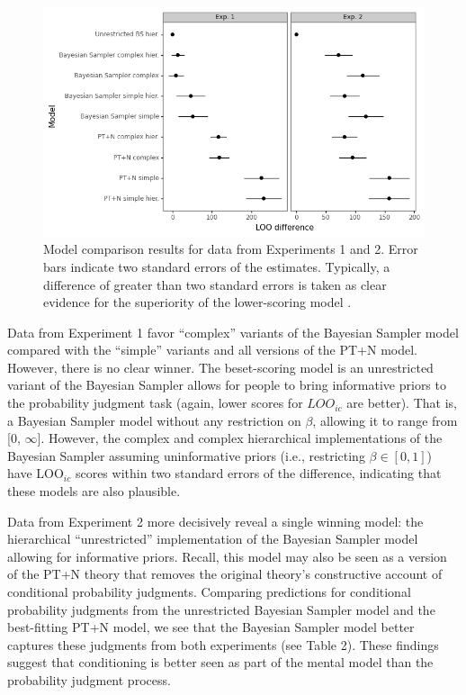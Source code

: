 \documentclass[
  english,
  man,floatsintext]{apa6}
\begin{document}
\begin{figure}[ht]
\centering
\includegraphics[width=6in]{plot_compare.png}
\caption{Model comparison results for data from Experiments 1 and 2. Error bars indicate two standard errors of the estimates. Typically, a difference of greater than two standard errors is taken as clear evidence for the superiority of the lower-scoring model \cite{sivula.etal2020}.}
\end{figure}

Data from Experiment 1 favor ``complex'' variants of the Bayesian Sampler model compared with the ``simple'' variants and all versions of the PT+N model. However, there is no clear winner. The beset-scoring model is an unrestricted variant of the Bayesian Sampler allows for people to bring informative priors to the probability judgment task (again, lower scores for \(LOO_{ic}\) are better). That is, a Bayesian Sampler model without any restriction on \(\beta\), allowing it to range from {[}0, \(\infty\){]}. However, the complex and complex hierarchical implementations of the Bayesian Sampler assuming uninformative priors (i.e., restricting \(\beta \in [0,1]\)) have \(\text{LOO}_{ic}\) scores within two standard errors of the difference, indicating that these models are also plausible.

Data from Experiment 2 more decisively reveal a single winning model: the hierarchical ``unrestricted'' implementation of the Bayesian Sampler model allowing for informative priors. Recall, this model may also be seen as a version of the PT+N theory that removes the original theory's constructive account of conditional probability judgments. Comparing predictions for conditional probability judgments from the unrestricted Bayesian Sampler model and the best-fitting PT+N model, we see that the Bayesian Sampler model better captures these judgments from both experiments (see Table 2). These findings suggest that conditioning is better seen as part of the mental model than the probability judgment process.
\end{document}

